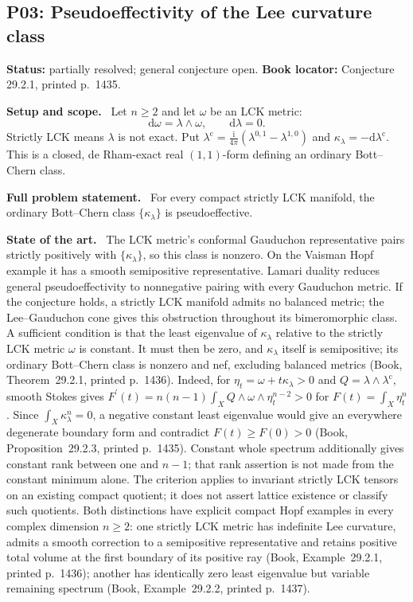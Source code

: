 \documentclass[11pt]{article}
\newcommand{\field}[1]{\par\medskip\noindent\textbf{#1.}\ }
\begin{document}
\subsection{P03: Pseudoeffectivity of the Lee curvature class}
\label{P03}
\noindent\textbf{Status:} partially resolved; general conjecture open. \textbf{Book locator:} Conjecture 29.2.1, printed p.~1435.
\field{Setup and scope} Let $n\geq2$ and let $\omega$ be an LCK metric:
\[\mathrm d\omega=\lambda\wedge\omega,\qquad \mathrm d\lambda=0.\]
Strictly LCK means $\lambda$ is not exact. Put $\lambda^{\mathrm c}=\frac{\mathrm i}{4\pi}(\lambda^{0,1}-\lambda^{1,0})$ and $\kappa_\lambda=-\mathrm d\lambda^{\mathrm c}$. This is a closed, de Rham-exact real $(1,1)$-form defining an ordinary Bott--Chern class.
\field{Full problem statement} For every compact strictly LCK manifold, the ordinary Bott--Chern class $\{\kappa_\lambda\}$ is pseudoeffective.
\field{State of the art} The LCK metric's conformal Gauduchon representative pairs strictly positively with $\{\kappa_\lambda\}$, so this class is nonzero. On the Vaisman Hopf example it has a smooth semipositive representative. Lamari duality reduces general pseudoeffectivity to nonnegative pairing with every Gauduchon metric. If the conjecture holds, a strictly LCK manifold admits no balanced metric; the Lee--Gauduchon cone gives this obstruction throughout its bimeromorphic class.
 A sufficient condition is that the least eigenvalue of $\kappa_\lambda$ relative to the strictly LCK metric $\omega$ is constant. It must then be zero, and $\kappa_\lambda$ itself is semipositive; its ordinary Bott--Chern class is nonzero and nef, excluding balanced metrics (Book, Theorem~29.2.1, printed p.~1436). Indeed, for $\eta_t=\omega+t\kappa_\lambda>0$ and $Q=\lambda\wedge\lambda^{\mathrm c}$, smooth Stokes gives $F^{\prime}(t)=n(n-1)\int_XQ\wedge\omega\wedge\eta_t^{n-2}>0$ for $F(t)=\int_X\eta_t^n$. Since $\int_X\kappa_\lambda^n=0$, a negative constant least eigenvalue would give an everywhere degenerate boundary form and contradict $F(t)\geq F(0)>0$ (Book, Proposition~29.2.3, printed p.~1435). Constant whole spectrum additionally gives constant rank between one and $n-1$; that rank assertion is not made from the constant minimum alone. The criterion applies to invariant strictly LCK tensors on an existing compact quotient; it does not assert lattice existence or classify such quotients. Both distinctions have explicit compact Hopf examples in every complex dimension $n\geq2$: one strictly LCK metric has indefinite Lee curvature, admits a smooth correction to a semipositive representative and retains positive total volume at the first boundary of its positive ray (Book, Example~29.2.1, printed p.~1436); another has identically zero least eigenvalue but variable remaining spectrum (Book, Example~29.2.2, printed p.~1437).
\end{document}
